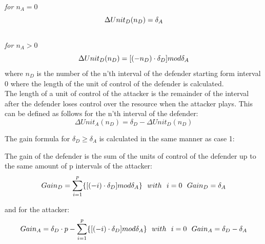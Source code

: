 \textit{for $n_{A} = 0$}
\begin{equation}\label{first}
\Delta Unit_{D}(n_{D}) = \delta_{A} \\
\end{equation}
\\ 
\textit{for $n_{A} > 0$}
\begin{equation}\label{first}
\Delta Unit_{D}(n_{D}) =  [( - n_{D}  ) \cdot \delta_{D}] mod \delta_{A}\\
\end{equation}
where $n_{D}$ is the number of the n'th interval of the defender starting form interval 0 where the length of the unit of control of the defender is calculated.\\

The length of a unit of control of the attacker is the remainder of the interval after the defender loses control over the resource when the attacker plays. This can be defined as follows for the n'th interval of the defender:
\begin{equation}\label{first}
\Delta Unit_{A}(n_{D}) = \delta_{D} - \Delta Unit_{D}(n_{D})
\end{equation}

The gain formula for $\delta_{D} \geq \delta_{A}$ is calculated in the same manner as case 1:

The gain of the defender is the sum of the units of control of the defender up to the same amount of p intervals of the attacker:
\begin{equation}\label{first}
Gain_{D} =\sum_{i=1}^{p} \lbrace [( - i ) \cdot \delta_{D}] mod \delta_{A} \rbrace   ~~with~~ i=0 ~~ Gain_{D}=\delta_{A}\\ 
\end{equation}

and for the attacker:
\begin{equation}\label{first}
Gain_{A} =\delta_{D} \cdot p - \sum_{i=1}^{p} \lbrace [( - i ) \cdot \delta_{D}] mod \delta_{A} \rbrace   ~~with~~ i=0 ~~ Gain_{A}=\delta_{D} - \delta_{A}\\ 
\end{equation}

